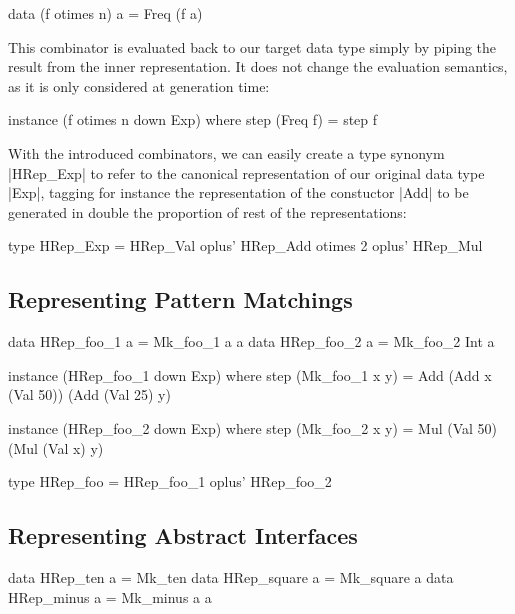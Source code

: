 \begin{code}
data (f otimes n) a = Freq (f a)
\end{code}

This combinator is evaluated back to our target data type simply by piping the
result from the inner representation.
%
It does not change the evaluation semantics, as it is only considered at
generation time:

\begin{code}
instance (f otimes n down Exp) where
  step (Freq f) = step f
\end{code}

With the introduced combinators, we can easily create a type synonym |HRep_Exp|
to refer to the canonical representation of our original data type |Exp|,
tagging for instance the representation of the constuctor |Add| to be generated
in double the proportion of rest of the representations:

\begin{code}
type HRep_Exp  =       HRep_Val
               oplus'  HRep_Add  otimes 2
               oplus'  HRep_Mul
\end{code}


\subsection{\textbf{Representing Pattern Matchings}}

\begin{code}
data HRep_foo_1  a = Mk_foo_1 a a
data HRep_foo_2  a = Mk_foo_2 Int a
\end{code}

\begin{code}
instance (HRep_foo_1 down Exp) where
  step (Mk_foo_1 x y)
    = Add (Add x (Val 50)) (Add (Val 25) y)

instance (HRep_foo_2 down Exp) where
  step (Mk_foo_2 x y)
    = Mul (Val 50) (Mul (Val x) y)
\end{code}

\begin{code}
type HRep_foo  =       HRep_foo_1
               oplus'  HRep_foo_2
\end{code}

\subsection{\textbf{Representing Abstract Interfaces}}

\begin{code}
data HRep_ten       a = Mk_ten
data HRep_square    a = Mk_square   a
data HRep_minus     a = Mk_minus    a a
\end{code}

